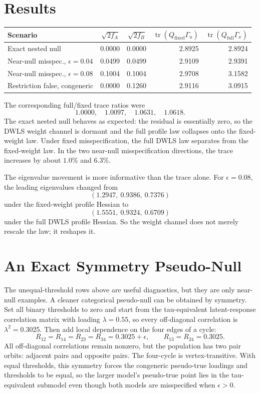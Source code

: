 \documentclass[11pt]{article}
\newcommand{\tr}{\operatorname{tr}}
\begin{document}
\section{Results}

\begin{center}
\begin{tabular}{lrrrr}
\toprule
Scenario & $\sqrt{2f_A}$ & $\sqrt{2f_B}$ &
$\tr(Q_{\mathrm{fixed}}\Gamma_u)$ &
$\tr(Q_{\mathrm{full}}\Gamma_x)$ \\
\midrule
Exact nested null & 0.0000 & 0.0000 & 2.8925 & 2.8924 \\
Near-null misspec., $\epsilon=0.04$ & 0.0499 & 0.0499 & 2.9109 & 2.9391 \\
Near-null misspec., $\epsilon=0.08$ & 0.1004 & 0.1004 & 2.9708 & 3.1582 \\
Restriction false, congeneric & 0.0000 & 0.1260 & 2.9116 & 3.0915 \\
\bottomrule
\end{tabular}
\end{center}

The corresponding full/fixed trace ratios were
\[
  1.0000,\quad 1.0097,\quad 1.0631,\quad 1.0618 .
\]
The exact nested null behaves as expected: the residual is essentially zero, so
the DWLS weight channel is dormant and the full profile law collapses onto the
fixed-weight law. Under fixed misspecification, the full DWLS law separates from
the fixed-weight law. In the two near-null misspecification directions, the
trace increases by about $1.0\%$ and $6.3\%$.

The eigenvalue movement is more informative than the trace alone. For
$\epsilon=0.08$, the leading eigenvalues changed from
\[
  (1.2947,\ 0.9386,\ 0.7376)
\]
under the fixed-weight profile Hessian to
\[
  (1.5551,\ 0.9324,\ 0.6709)
\]
under the full DWLS profile Hessian. So the weight channel does not merely
rescale the law; it reshapes it.

\section{An Exact Symmetry Pseudo-Null}

The unequal-threshold rows above are useful diagnostics, but they are only
near-null examples. A cleaner categorical pseudo-null can be obtained by
symmetry. Set all binary thresholds to zero and start from the tau-equivalent
latent-response correlation matrix with loading $\lambda=0.55$, so every
off-diagonal correlation is $\lambda^2=0.3025$. Then add local dependence on the
four edges of a cycle:
\[
  R_{12}=R_{14}=R_{23}=R_{34}=0.3025+\epsilon,
  \qquad
  R_{13}=R_{24}=0.3025.
\]
All off-diagonal correlations remain nonzero, but the population has two pair
orbits: adjacent pairs and opposite pairs. The four-cycle is vertex-transitive.
With equal thresholds, this symmetry forces the congeneric pseudo-true loadings
and thresholds to be equal, so the larger model's pseudo-true point lies in the
tau-equivalent submodel even though both models are misspecified when
$\epsilon>0$.
\end{document}
